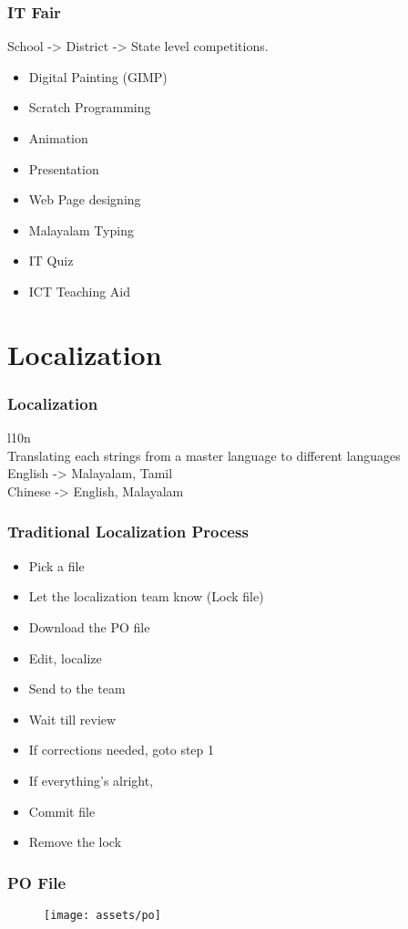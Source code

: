 \documentclass{beamer}
\begin{document}
\begin{frame}
\frametitle{IT Fair}
School -> District -> State level competitions.
\begin{itemize}
	\item Digital Painting (GIMP)
	\item Scratch Programming
	\item Animation
	\item Presentation
	\item Web Page designing
	\item Malayalam Typing
	\item IT Quiz
	\item ICT Teaching Aid
\end{itemize}
\end{frame}

\section{Localization}
\begin{frame}
	\frametitle{Localization}
	{\centering
		l10n \\
		Translating each strings from a master language to different languages
		\\
		\vspace{5mm}
		English -> Malayalam, Tamil
		\\
		Chinese -> English, Malayalam
		\\
	}
\end{frame}

\begin{frame}
\frametitle{Traditional Localization Process}
\begin{itemize}
	\item Pick a file
	\item Let the localization team know (Lock file)
	\item Download the PO file
	\item Edit, localize
	\item Send to the team
	\item Wait till review
	\item If corrections needed, goto step 1
	\item If everything's alright,
	\item Commit file
	\item Remove the lock
\end{itemize}
\end{frame}

\begin{frame}
\frametitle{PO File}
\begin{figure}
	\texttt{[image: assets/po]}
\end{figure}
\end{frame}
\end{document}
